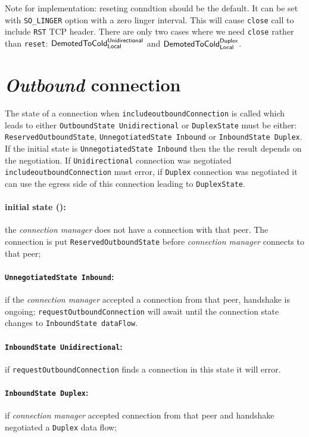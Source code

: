 \documentclass{article}
\def\TCP{\textsf{TCP}}
\def\InitialState{\textbullet}
\def\ReservedOutboundState{\texttt{ReservedOutboundState}}
\def\UnnegotiatedStateIn{\texttt{UnnegotiatedState Inbound}}
\def\OutboundStateUni{\texttt{OutboundState Unidirectional}}
\def\DuplexState{\texttt{DuplexState}}
\def\InboundStateUni{\texttt{InboundState Unidirectional}}
\def\InboundStateDup{\texttt{InboundState Duplex}}
\def\InboundStateAny{\texttt{InboundState dataFlow}}
\def\DemotedToColdDupLoc{$\text{\textsf{DemotedToCold}}^\text{\textsf{Duplex}}_\text{\textsf{Local}}$}
\def\DemotedToColdUniLoc{$\text{\textsf{DemotedToCold}}^\text{\textsf{Unidirectional}}_\text{\textsf{Local}}$}
\def\connmngr{\textit{connection manager}}
\begin{document}
{\small
Note for implementation: reseting conndtion should be the default.  It can be
set with \texttt{SO\_LINGER} option with a zero linger interval.  This will
cause \texttt{close} call to include \texttt{RST} \TCP{} header.  There are
only two cases where we need \texttt{close} rather than \texttt{reset}:
\DemotedToColdUniLoc{} and \DemotedToColdDupLoc{}.
}

\section{\textit{Outbound} connection}

The state of a connection when \texttt{includeoutboundConnection} is called
which leads to either \OutboundStateUni{} or \DuplexState{} must be either:
\ReservedOutboundState{}, \UnnegotiatedStateIn{} or
\InboundStateDup{}.  If the initial state is \UnnegotiatedStateIn{} then the
the result depends on the negotiation.  If \texttt{Unidirectional} connection was
negotiated \texttt{includeoutboundConnection} must error, if \texttt{Duplex}
connection was negotiated it can use the egress side of this connection leading
to \DuplexState{}.

\paragraph{\textnormal{initial state (\InitialState{})}:} the \connmngr{} does not have
  a connection with that peer.  The  connection is put \ReservedOutboundState{}
  before \connmngr{} connects to that peer;

\paragraph{\UnnegotiatedStateIn{}:} if the \connmngr{} accepted
  a connection from that peer, handshake is ongoing;
  \texttt{requestOutboundConnection} will await until the connection state
  changes to \InboundStateAny{}.

\paragraph{\InboundStateUni{}:} if \texttt{requestOutboundConnection} finds
a connection in this state it will error.

\paragraph{\InboundStateDup{}:} if \connmngr{} accepted connection from
  that peer and handshake negotiated a \texttt{Duplex} data flow;
\end{document}
